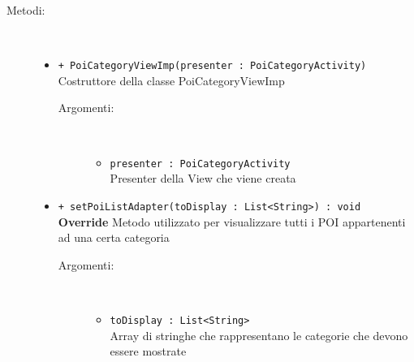 \documentclass[../DefinizioneDiProdotto.tex]{subfiles}
\begin{document}
\begin{description}
\begin{itemize}
	\end{itemize}
	\item[Metodi:] \
	\begin{itemize}
		\item \texttt{+ PoiCategoryViewImp(presenter : PoiCategoryActivity)}\\
		Costruttore della classe PoiCategoryViewImp
		\begin{description}
			\item[Argomenti:] \
			\begin{itemize}
				\item \texttt{presenter : PoiCategoryActivity}\\
				Presenter della View che viene creata\end{itemize}
		\end{description}
		\item \texttt{+ setPoiListAdapter(toDisplay : List<String>) : void}\\
		\textbf{Override} Metodo utilizzato per visualizzare tutti i POI appartenenti ad una certa categoria
		\begin{description}
			\item[Argomenti:] \
			\begin{itemize}
				\item \texttt{toDisplay : List<String>}\\
				Array di stringhe che rappresentano le categorie che devono essere mostrate\end{itemize}
		\end{description}
	\end{itemize}
\end{description}
\end{document}
